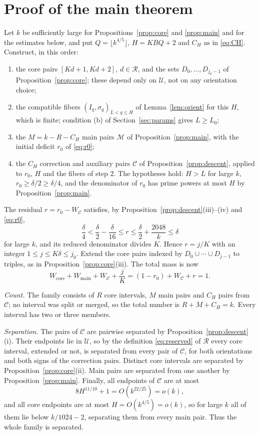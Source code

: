\documentclass[11pt,letterpaper]{article}
\numberwithin{equation}{section}
\theoremstyle{plain}
\theoremstyle{remark}
\newcommand{\cU}{\mathcal U}
\newcommand{\cR}{\mathcal R}
\newcommand{\cC}{\mathcal C}
\newcommand{\cM}{\mathcal M}
\newcommand{\core}{\mathrm{core}}
\newcommand{\main}{\mathrm{main}}
\begin{document}
\section{Proof of the main theorem}\label{sec:proof}

Let $k$ be sufficiently large for Propositions~\ref{prop:core} and \ref{prop:main} and for the estimates below, and put $Q=\lfloor k^{4/5}\rfloor$, $H=KBQ+2$ and $C_H$ as in \eqref{eq:CH}. Construct, in this order:
\begin{enumerate}
\item the core pairs $[Kd+1,Kd+2]$, $d\in\cR$, and the sets $D_0,\ldots,D_{j_0-1}$ of Proposition~\ref{prop:core}; these depend only on $\cU$, not on any orientation choice;
\item the compatible fibers $(I_q,\sigma_q)_{L<q\le H}$ of Lemma~\ref{lem:orient} for this $H$, which is finite; condition (b) of Section~\ref{sec:params} gives $L\ge L_0$;
\item the $M=k-R-C_H$ main pairs $\cM$ of Proposition~\ref{prop:main}, with the initial deficit $r_0$ of \eqref{eq:r0};
\item the $C_H$ correction and auxiliary pairs $\cC$ of Proposition~\ref{prop:descent}, applied to $r_0$, $H$ and the fibers of step 2. The hypotheses hold: $H>L$ for large $k$, $r_0\ge\delta/2\ge\delta/4$, and the denominator of $r_0$ has prime powers at most $H$ by Proposition~\ref{prop:main}.
\end{enumerate}
The residual $r=r_0-W_{\cC}$ satisfies, by Proposition~\ref{prop:descent}(iii)--(iv) and \eqref{eq:r0},
\[
\frac\delta4<\frac\delta2-\frac\delta{16}\le r\le\frac\delta2+\frac{2048}k\le\delta
\]
for large $k$, and its reduced denominator divides $K$. Hence $r=j/K$ with an integer $1\le j\le K\delta\le j_0$. Extend the core pairs indexed by $D_0\cup\cdots\cup D_{j-1}$ to triples, as in Proposition~\ref{prop:core}(iii). The total mass is now
\[
W_{\core}+W_{\main}+W_{\cC}+\frac jK=(1-r_0)+W_{\cC}+r=1 .
\]

\emph{Count.} The family consists of $R$ core intervals, $M$ main pairs and $C_H$ pairs from $\cC$; no interval was split or merged, so the total number is $R+M+C_H=k$. Every interval has two or three members.

\emph{Separation.} The pairs of $\cC$ are pairwise separated by Proposition~\ref{prop:descent}(i). Their endpoints lie in $\cU$, so by the definition \eqref{eq:reserved} of $\cR$ every core interval, extended or not, is separated from every pair of $\cC$, for both orientations and both signs of the correction pairs. Distinct core intervals are separated by Proposition~\ref{prop:core}(ii). Main pairs are separated from one another by Proposition~\ref{prop:main}. Finally, all endpoints of $\cC$ are at most
\[
8H^{11/10}+1=O(k^{22/25})=o(k),
\]
and all core endpoints are at most $H=O(k^{4/5})=o(k)$, so for large $k$ all of them lie below $k/1024-2$, separating them from every main pair. Thus the whole family is separated.
\end{document}
